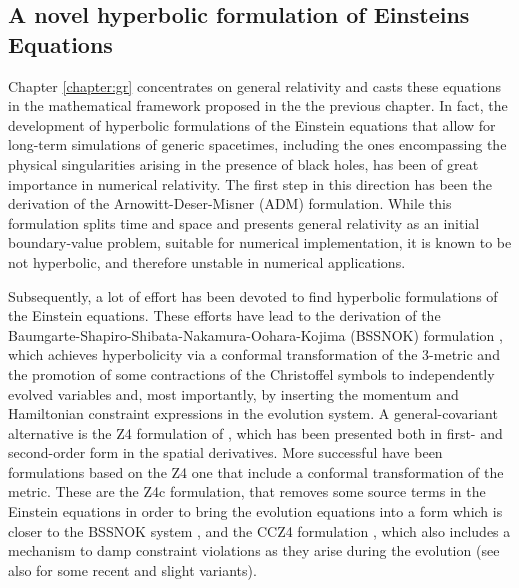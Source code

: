 \begin{fullwidth}

\subsection{A novel hyperbolic formulation of Einsteins Equations}
\label{sec:gr-intro-intro}
Chapter \vref{chapter:gr} concentrates on general relativity and casts
these equations in the mathematical framework proposed in the the
previous chapter.
In fact,
the development of hyperbolic formulations of the
Einstein equations that allow for long-term simulations of generic
spacetimes, including the ones encompassing the physical singularities
arising in the presence of black holes, has been of great
importance in numerical relativity. The first step in this direction has
been the derivation of the Arnowitt-Deser-Misner (ADM) formulation.
While this formulation splits time and
space and presents general relativity as an initial
boundary-value problem, suitable for numerical implementation, it is
known to be not hyperbolic, and therefore unstable in numerical
applications.

Subsequently, a lot of effort has been devoted to find hyperbolic
formulations of the Einstein equations. These efforts have lead to the
derivation of the Baumgarte-Shapiro-Shibata-Nakamura-Oohara-Kojima
(BSSNOK) formulation \cite{Shibata95,Baumgarte99,Nakamura87,Brown09},
which achieves hyperbolicity via a conformal transformation of the
3-metric and the promotion of some contractions of the Christoffel
symbols to independently evolved variables and, most importantly, by
inserting the momentum and Hamiltonian constraint expressions in the
evolution system. A general-covariant alternative is the Z4 formulation
of \cite{Bona:2003fj,Bona:2003qn,Alic:2009}, which has been presented
both in first- and second-order form in the spatial derivatives. More
successful have been formulations based on the Z4 one that include a
conformal transformation of the metric. These are the Z4c formulation,
that removes some source terms in the Einstein equations in order to
bring the evolution equations into a form which is closer to the BSSNOK
system \cite{Bernuzzi:2009ex}, and the CCZ4 formulation \cite{Alic:2011a,
	Alic2013}, which also includes a mechanism to damp constraint
violations as they arise during the evolution (see also
\cite{Sanchis2014, Bezares2017} for some recent and slight variants).


\end{fullwidth}
